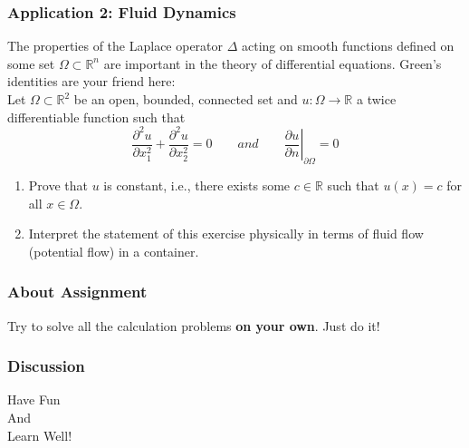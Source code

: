 \documentclass[11pt, t]{beamer}
\newcommand{\nullspace}{~\\[15pt]}
\begin{document}
\begin{frame}
    \frametitle{Application 2: Fluid Dynamics}
    The properties of the Laplace operator $\Delta$ acting on smooth functions defined on some set $\Omega \subset \mathbb{R}^{n}$ are important in the theory of differential equations. Green's identities are your friend here:
    \nullspace
    Let $\Omega \subset \mathbb{R}^{2}$ be an open, bounded, connected set and $u: \Omega \rightarrow \mathbb{R}$ a twice differentiable function such that
    \[
        \frac{\partial^{2} u}{\partial x_{1}^{2}}+\frac{\partial^{2} u}{\partial x_{2}^{2}}=0
    \qquad and \qquad
        \left.\frac{\partial u}{\partial n}\right|_{\partial \Omega}=0
    \]
    \begin{enumerate}
        \item Prove that $u$ is constant, i.e., there exists some $c \in \mathbb{R}$ such that $u(x)=c$ for all $x \in \Omega$.
        \item Interpret the statement of this exercise physically in terms of fluid flow (potential flow) in a container.
    \end{enumerate}
\end{frame}

\begin{frame}
    \frametitle{About Assignment}
    Try to solve all the calculation problems \textbf{on your own}. Just do it!
    

\end{frame}

\begin{frame}
    \frametitle{Discussion}
    \vspace{1cm}
    \begin{center}
        \LARGE
        Have Fun\\
        And\\
        Learn Well!
    \end{center}
    \vspace{2cm}
\end{frame}
\end{document}
